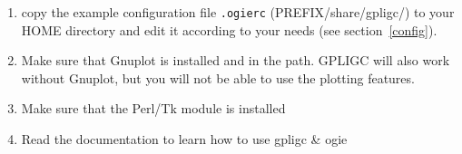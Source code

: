 \begin{enumerate}

\item copy the example configuration file
\texttt{.ogierc} (PREFIX/share/gpligc/) to your HOME directory
and edit it according to your needs (see section~\ref{config}).

\item Make sure that Gnuplot \cite{gnuplot} is installed and in the path.
GPLIGC will also work without Gnuplot,  but you will not be able to use the plotting features.

\item Make sure that the Perl/Tk \cite{perltk} module is installed

\item Read the documentation to learn how to use gpligc \& ogie

\end{enumerate}






